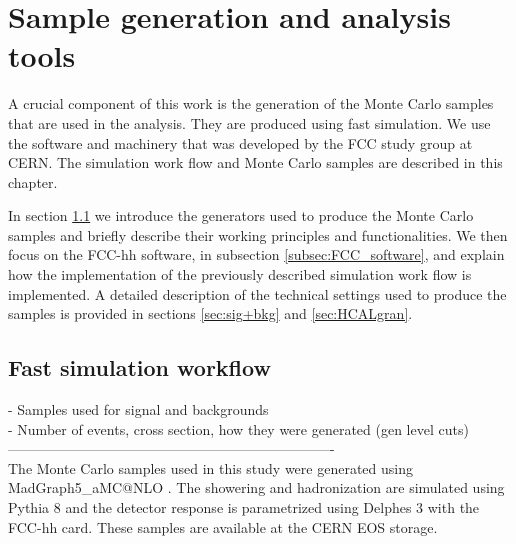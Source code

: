 
\chapter{Sample generation and analysis tools}
\label{chapter:tools}

A crucial component of this work is the generation of the Monte Carlo samples that are used in the analysis. They are produced using fast simulation. We use the software and machinery that was developed by the FCC study group at CERN. The simulation work flow and Monte Carlo samples are described in this chapter.

In section \ref{sec:workflow} we introduce the generators used to produce the Monte Carlo samples and briefly describe their working principles and functionalities. We then focus on the FCC-hh software, in subsection \ref{subsec:FCC_software}, and explain how the implementation of the previously described simulation work flow is implemented. A detailed description of the technical settings used to produce the samples is provided in sections \ref{sec:sig+bkg} and \ref{sec:HCALgran}.


\section{Fast simulation workflow}
\label{sec:workflow}

- Samples used for signal and backgrounds \\
- Number of events, cross section, how they were generated (gen level cuts)\\
----------------------------------------------------------------------\\
The Monte Carlo samples used in this study were generated using MadGraph5\_aMC@NLO  \cite{MG5}. The showering and hadronization are simulated using Pythia 8 \cite{Pythia8} and the detector response is parametrized using Delphes 3 \cite{Delphes} with the FCC-hh card. These samples are available at the CERN EOS storage. 

